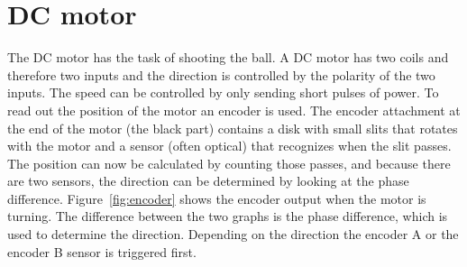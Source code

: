 \section{DC motor}\label{sec:dc-motor}
The DC motor has the task of shooting the ball.
A DC motor has two coils and therefore two inputs and the direction is controlled by the polarity of the two inputs.
The speed can be controlled by only sending short pulses of power.
To read out the position of the motor an encoder is used.
The encoder attachment at the end of the motor (the black part) contains a disk with small slits that rotates with the motor and a sensor (often optical) that recognizes when the slit passes.
The position can now be calculated by counting those passes, and because there are two sensors, the direction can be determined by looking at the phase difference.
Figure~\ref{fig:encoder} shows the encoder output when the motor is turning.
The difference between the two graphs is the phase difference, which is used to determine the direction.
Depending on the direction the encoder A or the encoder B sensor is triggered first.
